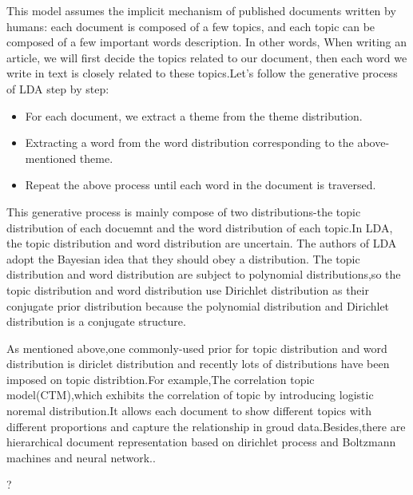 This model assumes the implicit mechanism of published documents written by humans: each document is composed of a few topics, and each topic can be composed of a few important words description. In other words, When writing an article, we will first decide the topics related to our document, then each word we write in text is closely related to these topics.Let's follow the generative process of LDA step by step:
\begin{itemize}
  \item For each document, we extract a theme from the theme distribution.
  \item Extracting a word from the word distribution corresponding to the above-mentioned theme.
  \item Repeat the above process until each word in the document is traversed.
\end{itemize}

This generative process is mainly compose of two distributions-the topic distribution of each docuemnt and the word distribution of each topic.In LDA, the topic distribution and word distribution are uncertain. The authors of LDA adopt the Bayesian idea that they should obey a distribution. The topic distribution and word distribution are subject to  polynomial distributions,so the topic distribution and word distribution use Dirichlet distribution as their conjugate prior distribution because the polynomial distribution and Dirichlet distribution is a conjugate structure.

As mentioned above,one commonly-used prior for topic distribution and word distribution is diriclet distribution and recently lots of distributions have been imposed on topic distribtion.For example,The correlation topic model(CTM)\cite{A CORRELATED TOPIC MODEL OF SCIENCE},which exhibits the correlation of topic by introducing logistic noremal distribution.It allows each document to show different topics with different proportions and capture the relationship in groud data.Besides,there are hierarchical document representation based on dirichlet process and Boltzmann machines and neural network.\cite{dirichlet brlief network for topic structure}.



?

